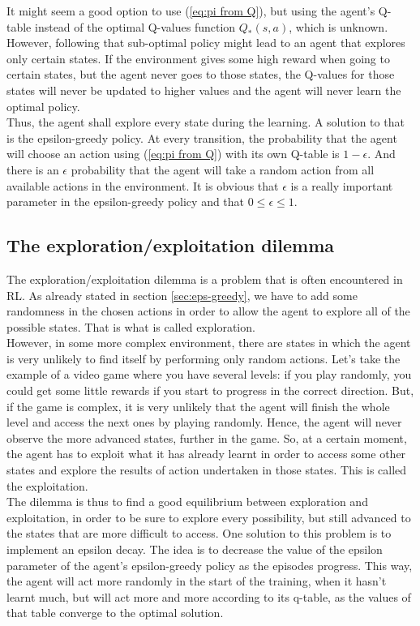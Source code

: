 It might seem a good option to use (\ref{eq:pi from Q}), but using the agent's Q-table instead of the optimal Q-values function $Q_*(s,a)$, which is unknown. However, following that sub-optimal policy might lead to an agent that explores only certain states. If the environment gives some high reward when going to certain states, but the agent never goes to those states, the Q-values for those states will never be updated to higher values and the agent will never learn the optimal policy.\\

Thus, the agent shall explore every state during the learning. A solution to that is the epsilon-greedy policy. At every transition, the probability that the agent will choose an action using (\ref{eq:pi from Q}) with its own Q-table is $1-\epsilon$. And there is an $\epsilon$ probability that the agent will take a random action from all available actions in the environment. It is obvious that $\epsilon$ is a really important parameter in the epsilon-greedy policy and that $0 \leq \epsilon \leq 1$.

\subsection{The exploration/exploitation dilemma}

The exploration/exploitation dilemma is a problem that is often encountered in RL. As already stated in section \ref{sec:eps-greedy}, we have to add some randomness in the chosen actions in order to allow the agent to explore all of the possible states. That is what is called exploration.\\

However, in some more complex environment, there are states in which the agent is very unlikely to find itself by performing only random actions. Let's take the example of a video game where you have several levels: if you play randomly, you could get some little rewards if you start to progress in the correct direction. But, if the game is complex, it is very unlikely that the agent will finish the whole level and access the next ones by playing randomly. Hence, the agent will never observe the more advanced states, further in the game. So, at a certain moment, the agent has to exploit what it has already learnt in order to access some other states and explore the results of action undertaken in those states. This is called the exploitation.\\

The dilemma is thus to find a good equilibrium between exploration and exploitation, in order to be sure to explore every possibility, but still advanced to the states that are more difficult to access. One solution to this problem is to implement an epsilon decay. The idea is to decrease the value of the epsilon parameter of the agent's epsilon-greedy policy as the episodes progress. This way, the agent will act more randomly in the start of the training, when it hasn't learnt much, but will act more and more according to its q-table, as the values of that table converge to the optimal solution.